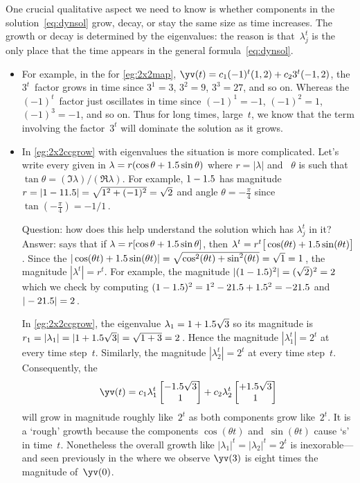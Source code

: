 One crucial qualitative aspect we need to know is whether components in the solution~\eqref{eq:dynsol} grow, decay, or stay the same size as time increases.
The growth or decay is determined by the eigenvalues:
the reason is that~\(\lambda_j^t\) is the only place that the time appears in the general formula~\eqref{eq:dynsol}.
\begin{itemize}
\item For example, in the  for \autoref{eg:2x2map}, \(\yv(t)=c_1(-1)^t(1,2)+c_23^t(-1,2)\), the \(3^t\)~factor grows in time since \(3^1=3\), \(3^2=9\), \(3^3=27\), and so on.
Whereas the \((-1)^t\)~factor just oscillates in time since \((-1)^1=-1\), \((-1)^2=1\), \((-1)^3=-1\), and so on.
Thus for long times, large~\(t\), we know that the term involving the factor~\(3^t\) will dominate the solution as it grows.

\item In \autoref{eg:2x2ccgrow} with  eigenvalues the situation is more complicated.
Let's write every given  in  
\(\lambda=r(\cos\theta+1.5\sin\theta)\) where  \(r=|\lambda|\) and ~\(\theta\) is such that \(\tan\theta=(\Im\lambda)/(\Re\lambda)\).
For example, \(1-1.5\) has magnitude \(r=|1-11.5|=\sqrt{1^2+(-1)^2}=\sqrt2\) and angle \(\theta=-\frac\pi4\) since \(\tan(-\frac\pi4)=-1/1\)\,.

Question: how does this help understand the solution which has \(\lambda_j^t\) in it?
Answer:  says that if \(\lambda=r[\cos\theta+1.5\sin\theta]\), then \(\lambda^t=r^t\big[\cos(\theta t)+1.5\sin(\theta t)\big]\).
Since the  \(|\cos(\theta t)+1.5\sin(\theta t)|=\sqrt{\cos^2(\theta t)+\sin^2(\theta t)}=\sqrt1=1\)\,, the magnitude \(|\lambda^t|=r^t\).
For example, the magnitude \(|(1-1.5)^2|=(\sqrt2)^2=2\) which we check by computing \((1-1.5)^2=1^2-21.5+1.5^2=-21.5\) and \(|-21.5|=2\)\,.

In \autoref{eg:2x2ccgrow}, the eigenvalue \(\lambda_1=1+1.5\sqrt3\) so its magnitude is \(r_1=|\lambda_1|=|1+1.5\sqrt3|=\sqrt{1+3}=2\)\,.
Hence the magnitude \(|\lambda_1^t|=2^t\) at every time step~\(t\).
Similarly, the magnitude \(|\lambda_2^t|=2^t\) at every time step~\(t\).
Consequently, the 
\begin{equation*}
\yv(t)=c_1\lambda_1^t\begin{bmatrix} -\i\sqrt3\\1 \end{bmatrix}
+c_2\lambda_2^t\begin{bmatrix} +\i\sqrt3\\1 \end{bmatrix}
\end{equation*}
will grow in magnitude roughly like~\(2^t\) as both components grow like~\(2^t\).
It is a `rough' growth because the components \(\cos(\theta t)\) and~\(\sin(\theta t)\)  cause `s' in time~\(t\).
Nonetheless the overall growth like \(|\lambda_1|^t=|\lambda_2|^t=2^t\) is inexorable---and seen previously in the  where we observe \(\yv(3)\) is eight times the magnitude of~\(\yv(0)\).
\end{itemize}
